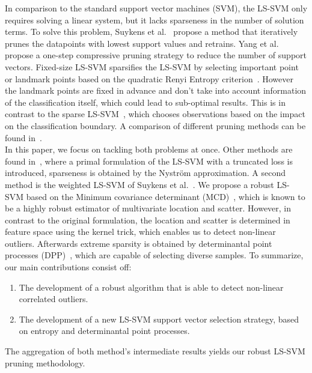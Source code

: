\documentclass[preprint,12pt]{elsarticle}
\begin{document}
	In comparison to the standard support vector machines (SVM), the LS-SVM only requires solving a linear system, but it lacks sparseness in the number of solution terms. To solve this problem, Suykens et al.~\cite{suykens2000sparse} propose a method that iteratively prunes the datapoints with lowest support values and retrains. Yang et al.~\cite{yang2014sparse} propose a one-step compressive pruning strategy to reduce the number of support vectors. Fixed-size LS-SVM sparsifies the LS-SVM by selecting important point or landmark points based on the quadratic Renyi Entropy criterion~\cite{suykens2002least}. However the landmark points are fixed in advance and don't take into account information of the classification itself, which could lead to sub-optimal results. This is in contrast to the sparse LS-SVM~\cite{suykens2000sparse}, which chooses observations based on the impact on the classification boundary. A comparison of different pruning methods can be found in~\cite{hoegaerts2004comparison}. \\
	
	In this paper, we focus on tackling both problems at once.
	Other methods are found in~\cite{chen2018sparse}, where a primal formulation of the LS-SVM with a truncated loss is introduced, sparseness is obtained by the Nystr\"{o}m approximation. A second method is the weighted LS-SVM of Suykens et al.~\cite{suykens2002weighted}. We propose a robust LS-SVM based on the Minimum covariance determinant (MCD)~\cite{hubert2010minimum}, which is known to be a highly robust 	estimator of multivariate location and scatter. However, in contrast to the original formulation, the location and scatter is determined in feature space using the kernel trick, which enables us to detect non-linear outliers. Afterwards extreme sparsity is obtained by determinantal point processes (DPP)~\cite{kulesza2012determinantal}, which are capable of selecting diverse samples. To summarize, our main contributions consist off:
	\begin{enumerate}
		\item The development of a robust algorithm that is able to detect non-linear correlated outliers.
		\item The development of a new LS-SVM support vector selection strategy, based on entropy and determinantal point processes.
	\end{enumerate}
	The aggregation of both method's intermediate results yields our robust LS-SVM pruning methodology. \\ 
	
\end{document}

